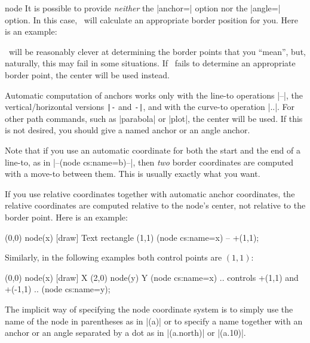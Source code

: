 \begin{coordinatesystem}{node}
    It is possible to provide \emph{neither} the |anchor=| option nor the
    |angle=| option. In this case, \tikzname\ will calculate an appropriate
    border position for you. Here is an example:
\begin{codeexample}[]
\end{codeexample}

    \tikzname\ will be reasonably clever at determining the border points that
    you ``mean'', but, naturally, this may fail in some situations. If
    \tikzname\ fails to determine an appropriate border point, the center will
    be used instead.

    Automatic computation of anchors works only with the line-to operations
    |--|, the vertical/horizontal versions \verb!|-! and \verb!-|!, and with
    the curve-to operation |..|. For other path commands, such as |parabola| or
    |plot|, the center will be used. If this is not desired, you should give a
    named anchor or an angle anchor.

    Note that if you use an automatic coordinate for both the start and the end
    of a line-to, as in |--(node cs:name=b)--|, then \emph{two} border
    coordinates are computed with a move-to between them. This is usually
    exactly what you want.

    If you use relative coordinates together with automatic anchor coordinates,
    the relative coordinates are computed relative to the node's center, not
    relative to the border point. Here is an example:
\begin{codeexample}[]
\tikz \draw (0,0) node(x) [draw] {Text}
            rectangle (1,1)
            (node cs:name=x) -- +(1,1);
\end{codeexample}

    Similarly, in the following examples both control points are $(1,1)$:
\begin{codeexample}[]
\tikz \draw (0,0) node(x) [draw] {X}
            (2,0) node(y) {Y}
            (node cs:name=x) .. controls +(1,1) and +(-1,1) ..
            (node cs:name=y);
\end{codeexample}

    The implicit way of specifying the node coordinate system is to simply use
    the name of the node in parentheses as in |(a)| or to specify a name
    together with an anchor or an angle separated by a dot as in |(a.north)| or
    |(a.10)|.


\end{coordinatesystem}

